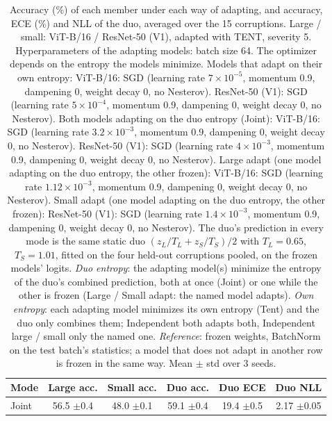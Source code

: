 \begin{table}[t]
    \centering
    \small
    \caption{Accuracy (\%) of each member under each way of adapting, and accuracy, ECE (\%) and NLL of the duo, averaged over the 15 corruptions. Large / small: ViT-B/16 / ResNet-50 (V1), adapted with TENT, severity 5. Hyperparameters of the adapting models: batch size 64. The optimizer depends on the entropy the models minimize. Models that adapt on their own entropy: ViT-B/16: SGD (learning rate $7 \times 10^{-5}$, momentum 0.9, dampening 0, weight decay 0, no Nesterov). ResNet-50 (V1): SGD (learning rate $5 \times 10^{-4}$, momentum 0.9, dampening 0, weight decay 0, no Nesterov). Both models adapting on the duo entropy (Joint): ViT-B/16: SGD (learning rate $3.2 \times 10^{-3}$, momentum 0.9, dampening 0, weight decay 0, no Nesterov). ResNet-50 (V1): SGD (learning rate $4 \times 10^{-3}$, momentum 0.9, dampening 0, weight decay 0, no Nesterov). Large adapt (one model adapting on the duo entropy, the other frozen): ViT-B/16: SGD (learning rate $1.12 \times 10^{-3}$, momentum 0.9, dampening 0, weight decay 0, no Nesterov). Small adapt (one model adapting on the duo entropy, the other frozen): ResNet-50 (V1): SGD (learning rate $1.4 \times 10^{-3}$, momentum 0.9, dampening 0, weight decay 0, no Nesterov). The duo's prediction in every mode is the same static duo $(z_L / T_L + z_S / T_S) / 2$ with $T_L = 0.65$, $T_S = 1.01$, fitted on the four held-out corruptions pooled, on the frozen models' logits. \emph{Duo entropy}: the adapting model(s) minimize the entropy of the duo's combined prediction, both at once (Joint) or one while the other is frozen (Large / Small adapt: the named model adapts). \emph{Own entropy}: each adapting model minimizes its own entropy (Tent) and the duo only combines them; Independent both adapts both, Independent large / small only the named one. \emph{Reference}: frozen weights, BatchNorm on the test batch's statistics; a model that does not adapt in another row is frozen in the same way. Mean $\pm$ std over 3 seeds.}
    \label{tab:adaptation_modes_summary:tent__vitb16_rn50v1_bn}
    \begin{tabular}{lccccc}
        \toprule
        Mode & Large acc. & Small acc. & Duo acc. & Duo ECE & Duo NLL \\
        \midrule
        Joint & 56.5 {\scriptsize$\pm$0.4} & 48.0 {\scriptsize$\pm$0.1} & 59.1 {\scriptsize$\pm$0.4} & 19.4 {\scriptsize$\pm$0.5} & 2.17 {\scriptsize$\pm$0.05} \\

\end{tabular}
\end{table}
